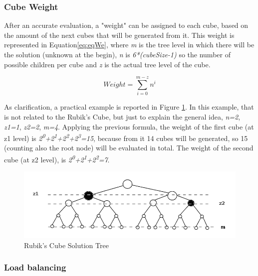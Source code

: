\documentclass[a4paper]{article}
\begin{document}
\subsubsection{Cube Weight}
\label{sec:cw}

After an accurate evaluation, a "weight" can be assigned to each cube, based on the amount of the next cubes that will be generated from it. This weight is represented in Equation\ref{eq:eqWe}, where \textit{m} is the tree level in which there will be the solution (unknown at the begin), \textit{n} is \textit{6*(cubeSize-1)} so the number of possible children per cube and \textit{z} is the actual tree level of the cube.

\begin{equation} 
\label{eq:eqWe}
Weight = \sum_{i=0}^{m-z}{n^i}
\end{equation}
\FloatBarrier

As clarification, a practical example is reported in Figure \ref{fig:treeBin}. In this example, that is not related to the Rubik's Cube, but just to explain the general idea, \textit{n=2}, \textit{z1=1}, \textit{z2=2}, \textit{m=4}. Applying the previous formula, the weight of the first cube (at z1 level) is \textit{2\textsuperscript{0}+2\textsuperscript{1}+2\textsuperscript{2}+2\textsuperscript{3}=15}, because from it 14 cubes will be generated, so 15 (counting also the root node) will be evaluated in total. The weight of the second cube (at z2 level), is \textit{2\textsuperscript{0}+2\textsuperscript{1}+2\textsuperscript{2}=7}. 

\begin{figure}[ht]
  \centering
  \includegraphics[width=0.8\linewidth]{tree_bin}
  \caption{Rubik's Cube Solution Tree}
  \label{fig:treeBin}
\end{figure}
\FloatBarrier

\subsubsection{Load balancing}
\label{sec:lb}
\end{document}
